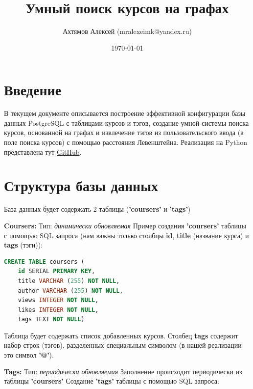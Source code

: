 \documentclass[12pt]{article}
\title{Умный поиск курсов на графах}
\author{Ахтямов Алексей (mralexeimk@yandex.ru)}
\date{\today}
\begin{document}
\maketitle

\section*{Введение}
В текущем документе описывается построение эффективной конфигурации базы данных PostgreSQL с таблицами курсов и тэгов, создание умной системы поиска курсов, основанной на графах и извлечение тэгов из пользовательского ввода (в поле поиска курсов) с помощью расстояния Левенштейна. \newline
Реализация на Python представлена тут \href{https://github.com/Yedom/SmartSearch_Template/blob/main/Main.ipynb}{\color{blue}GitHub}.
\section*{Структура базы данных}
База данных будет содержать 2 таблицы (\textbf{'coursers'} и \textbf{'tags'}) \newline

\noindent \textbf{Coursers:} \newline
Тип: \textit{динамически обновляемая} \newline
Пример создания \textbf{'coursers'} таблицы с помощью SQL запроса (нам важны только столбцы \textbf{id}, \textbf{title} (название курса) и \textbf{tags} (тэги)): \newline

\begin{lstlisting}[language=sql]
CREATE TABLE coursers (
	id SERIAL PRIMARY KEY,
	title VARCHAR (255) NOT NULL,
	author VARCHAR (255) NOT NULL,
	views INTEGER NOT NULL,
	likes INTEGER NOT NULL,
	tags TEXT NOT NULL)
\end{lstlisting}

\noindent Таблица будет содержать список добавленных курсов. \newline
Столбец \textbf{tags} содержит набор строк (тэгов), разделенных специальным символом (в нашей реализации это символ \textbf{'@'}). \newline

\noindent \textbf{Tags:} \newline
Тип: \textit{периодически обновляемая} \newline
Заполнение происходит периодически из таблицы \textbf{'coursers'} \newline
Создание \textbf{'tags'} таблицы с помощью SQL запроса: \newline
\end{document}
